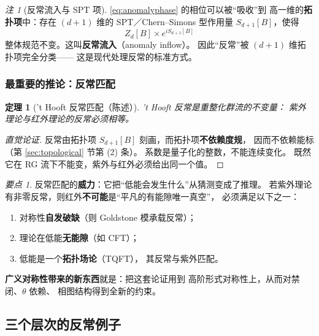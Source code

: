 \documentclass[UTF8,a4paper,11pt]{ctexart}
\theoremstyle{plain}
\newtheorem{theorem}{定理}[section]
\theoremstyle{definition}
\theoremstyle{remark}
\newtheorem{remark}{注}[section]
\newtheorem{keypoint}{要点}[section]
\newcommand{\en}[1]{\textsf{#1}}       %
\begin{document}
\begin{remark}[反常流入与 SPT 项]
\eqref{eq:anomalyphase} 的相位可以被“吸收”到
高一维的\textbf{拓扑项}中：存在 $(d+1)$ 维的
SPT／Chern--Simons 型作用量 $S_{d+1}[B]$，使得
\begin{equation}
  Z_d[B]\times e^{iS_{d+1}[B]}
\end{equation}
整体规范不变。这叫\textbf{反常流入}（\en{anomaly inflow}）。
因此“反常”被 $(d+1)$ 维拓扑项完全分类——
这是现代处理反常的标准方式。
\end{remark}

\subsubsection{最重要的推论：反常匹配}
\label{subsec:anomalymatch}

\begin{theorem}['t Hooft 反常匹配（陈述）]
\label{thm:matching}
't Hooft 反常是重整化群流的不变量：
紫外理论与红外理论的反常必须相等。
\end{theorem}

\begin{proof}[直觉论证]
反常由拓扑项 $S_{d+1}[B]$ 刻画，而拓扑项\textbf{不依赖度规}，
因而不依赖能标（第 \ref{sec:topological} 节第 (2) 条）。
系数是量子化的整数，不能连续变化。
既然它在 RG 流下不能变，紫外与红外必须给出同一个值。
\end{proof}

\begin{keypoint}
\label{kp:matching-power}
反常匹配的\textbf{威力}：它把“低能会发生什么”从猜测变成了推理。
若紫外理论有非零反常，则红外\textbf{不可能}是“平凡的有能隙唯一真空”，
必须满足以下之一：
\begin{enumerate}[label=(\arabic*)]
  \item 对称性\textbf{自发破缺}（则 Goldstone 模承载反常）；
  \item 理论在低能\textbf{无能隙}（如 CFT）；
  \item 低能是一个\textbf{拓扑场论}（TQFT），
        其反常与紫外匹配。
\end{enumerate}
\textbf{广义对称性带来的新东西}就是：把这套论证用到
高阶形式对称性上，从而对禁闭、$\theta$ 依赖、
相图结构得到全新的约束。
\end{keypoint}

\subsection{三个层次的反常例子}
\end{document}
